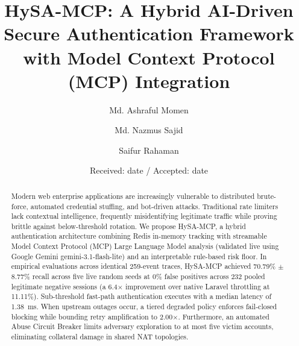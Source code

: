 \documentclass[smallextended]{svjour3}
\begin{document}
\title{HySA-MCP: A Hybrid AI-Driven Secure Authentication Framework with Model Context Protocol (MCP) Integration}

\author{Md. Ashraful Momen \and Md. Nazmus Sajid \and Saifur Rahaman}


\date{Received: date / Accepted: date}
\maketitle

\begin{abstract}
Modern web enterprise applications are increasingly vulnerable to distributed brute-force, automated credential stuffing, and bot-driven attacks. Traditional rate limiters lack contextual intelligence, frequently misidentifying legitimate traffic while proving brittle against below-threshold rotation. We propose HySA-MCP, a hybrid authentication architecture combining Redis in-memory tracking with streamable Model Context Protocol (MCP) Large Language Model analysis (validated live using Google Gemini gemini-3.1-flash-lite) and an interpretable rule-based risk floor. In empirical evaluations across identical 259-event traces, HySA-MCP achieved 70.79\% $\pm$ 8.77\% recall across five live random seeds at 0\% false positives across 232 pooled legitimate negative sessions (a 6.4$\times$ improvement over native Laravel throttling at 11.11\%). Sub-threshold fast-path authentication executes with a median latency of 1.38~ms. When upstream outages occur, a tiered degraded policy enforces fail-closed blocking while bounding retry amplification to 2.00$\times$. Furthermore, an automated Abuse Circuit Breaker limits adversary exploration to at most five victim accounts, eliminating collateral damage in shared NAT topologies.

\end{abstract}
\end{document}
